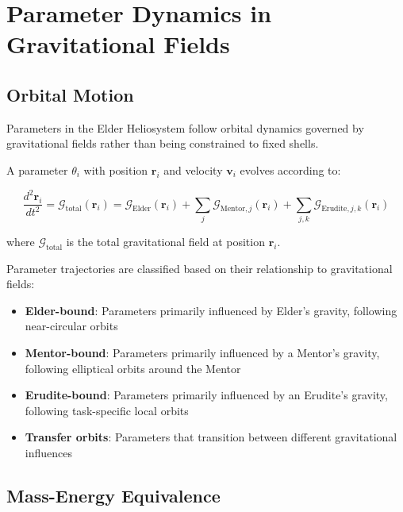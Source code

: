 \section{Parameter Dynamics in Gravitational Fields}

\subsection{Orbital Motion}

Parameters in the Elder Heliosystem follow orbital dynamics governed by gravitational fields rather than being constrained to fixed shells.

\begin{theorem}
A parameter $\theta_i$ with position $\mathbf{r}_i$ and velocity $\mathbf{v}_i$ evolves according to:

\begin{equation}
\frac{d^2\mathbf{r}_i}{dt^2} = \mathcal{G}_{\text{total}}(\mathbf{r}_i) = \mathcal{G}_{\text{Elder}}(\mathbf{r}_i) + \sum_{j} \mathcal{G}_{\text{Mentor},j}(\mathbf{r}_i) + \sum_{j,k} \mathcal{G}_{\text{Erudite},j,k}(\mathbf{r}_i)
\end{equation}

where $\mathcal{G}_{\text{total}}$ is the total gravitational field at position $\mathbf{r}_i$.
\end{theorem}

\begin{definition}
Parameter trajectories are classified based on their relationship to gravitational fields:
\begin{itemize}
    \item \textbf{Elder-bound}: Parameters primarily influenced by Elder's gravity, following near-circular orbits
    \item \textbf{Mentor-bound}: Parameters primarily influenced by a Mentor's gravity, following elliptical orbits around the Mentor
    \item \textbf{Erudite-bound}: Parameters primarily influenced by an Erudite's gravity, following task-specific local orbits
    \item \textbf{Transfer orbits}: Parameters that transition between different gravitational influences
\end{itemize}
\end{definition}

\subsection{Mass-Energy Equivalence}

